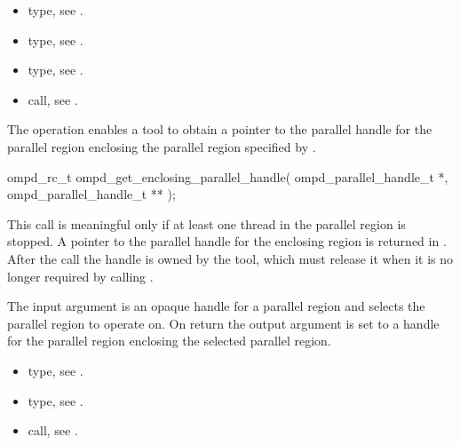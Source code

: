 \crossreferences
\begin{itemize}
	\item {} type, see .
	\item {} type, see .
	\item {} type, see .
	\item {} call, see .
\end{itemize}

\label{subsubsubsec:ompd_get_enclosing_parallel_handle}
\summary
The    operation enables a tool to obtain a
pointer to the parallel handle for the parallel region enclosing the parallel region specified by
.

\format

\begin{cspecific}
\begin{ompSyntax}
ompd_rc_t ompd_get_enclosing_parallel_handle(
  ompd_parallel_handle_t *,
  ompd_parallel_handle_t **
);
\end{ompSyntax}
\end{cspecific}


\descr
This call is meaningful only if at least one thread in the parallel region is stopped.
A pointer to the parallel handle for the enclosing region is returned in
. After the call the handle is owned by the tool, which must
release it when it is no longer required by calling .

\argdesc
The input argument  is an opaque handle for a parallel region and selects the parallel region to operate on.
On return the output argument  is set to a handle for the parallel region
enclosing the selected parallel region.

\crossreferences
\begin{itemize}
  \item {} type, see .
	\item {} type, see .
	\item {} call, see .
\end{itemize}

